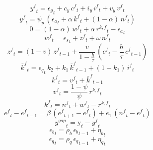 \begin{dmath}
{{y^{f}}}_{t}={{\epsilon_{g}}}_{t}+{{c_{y}}}\, {{c^{f}}}_{t}+{{i_{y}}}\, {{i^{f}}}_{t}+{{v_{y}}}\, {{v^{f}}}_{t}
\end{dmath}
\begin{dmath}
{{y^{f}}}_{t}={{\psi_{p}}}\, \left({{\epsilon_{a}}}_{t}+{{\alpha}}\, {{k^{f}}}_{t}+\left(1-{{\alpha}}\right)\, {{n^{f}}}_{t}\right)
\end{dmath}
\begin{dmath}
0=\left(1-{{\alpha}}\right)\, {{w^{f}}}_{t}+{{\alpha}}\, {{r^{k,f}}}_{t}-{{\epsilon_{a}}}_{t}
\end{dmath}
\begin{dmath}
{{w^{f}}}_{t}={{\epsilon_{s}}}_{t}+{{z^{f}}}_{t}+{{\omega}}\, {{n^{f}}}_{t}
\end{dmath}
\begin{dmath}
{{z^{f}}}_{t}=\left(1-{{v}}\right)\, {{z^{f}}}_{t-1}+\frac{{{v}}}{1-\frac{{{h}}}{{{\tau}}}}\, \left({{c^{f}}}_{t}-\frac{{{h}}}{{{\tau}}}\, {{c^{f}}}_{t-1}\right)
\end{dmath}
\begin{dmath}
{{\bar{k}^{f}}}_{t}={{\epsilon_{q}}}_{t}\, {{k_{2}}}+{{k_{1}}}\, {{\bar{k}^{f}}}_{t-1}+\left(1-{{k_{1}}}\right)\, {{i^{f}}}_{t}
\end{dmath}
\begin{dmath}
{{k^{f}}}_{t}={{v^{f}}}_{t}+{{\bar{k}^{f}}}_{t-1}
\end{dmath}
\begin{dmath}
{{v^{f}}}_{t}=\frac{1-{{\psi}}}{{{\psi}}}\, {{r^{k,f}}}_{t}
\end{dmath}
\begin{dmath}
{{k^{f}}}_{t}={{n^{f}}}_{t}+{{w^{f}}}_{t}-{{r^{k,f}}}_{t}
\end{dmath}
\begin{dmath}
{{e^{f}}}_{t}-{{e^{f}}}_{t-1}={{\beta}}\, \left({{e^{f}}}_{t+1}-{{e^{f}}}_{t}\right)+{{e_{1}}}\, \left({{n^{f}}}_{t}-{{e^{f}}}_{t}\right)
\end{dmath}
\begin{dmath}
{{y^{gap}}}_{t}={{\mathrm{y}}}_{t}-{{y^{f}}}_{t}
\end{dmath}
\begin{dmath}
{{\epsilon_{b}}}_{t}={{\rho_{b}}}\, {{\epsilon_{b}}}_{t-1}+{{\eta_{b}}}_{t}
\end{dmath}
\begin{dmath}
{{\epsilon_{q}}}_{t}={{\rho_{q}}}\, {{\epsilon_{q}}}_{t-1}+{{\eta_{q}}}_{t}
\end{dmath}

